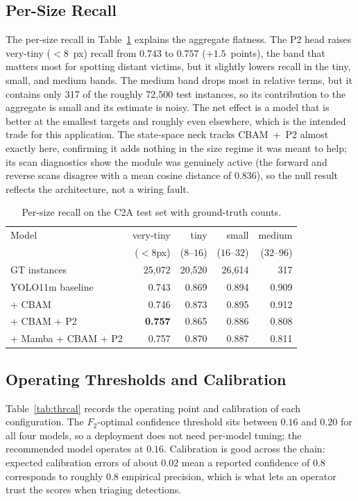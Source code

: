\subsection{Per-Size Recall}
The per-size recall in Table~\ref{tab:persize} explains the aggregate
flatness. The P2 head raises very-tiny ($<8$~px) recall from $0.743$ to
$0.757$ ($+1.5$~points), the band that matters most for spotting distant
victims, but it slightly lowers recall in the tiny, small, and medium bands.
The medium band drops most in relative terms, but it contains only 317 of the
roughly 72{,}500 test instances, so its contribution to the aggregate is
small and its estimate is noisy. The net effect is a model that is better at
the smallest targets and roughly even elsewhere, which is the intended trade
for this application. The state-space neck tracks CBAM~+~P2 almost exactly
here, confirming it adds nothing in the size regime it was meant to help; its
scan diagnostics show the module was genuinely active (the forward and
reverse scans disagree with a mean cosine distance of $0.836$), so the null
result reflects the architecture, not a wiring fault.

\begin{table}[H]
  \centering
  \caption{Per-size recall on the C2A test set with ground-truth counts.}
  \label{tab:persize}
  \begin{tabular}{@{}l r r r r@{}}
    \toprule
    Model & very-tiny & tiny & small & medium \\
    & ($<8$px) & ($8$--$16$) & ($16$--$32$) & ($32$--$96$) \\
    GT instances & 25{,}072 & 20{,}520 & 26{,}614 & 317 \\
    \midrule
    YOLO11m baseline    & 0.743 & 0.869 & 0.894 & 0.909 \\
    + CBAM              & 0.746 & 0.873 & 0.895 & 0.912 \\
    + CBAM + P2         & \textbf{0.757} & 0.865 & 0.886 & 0.808 \\
    + Mamba + CBAM + P2 & 0.757 & 0.870 & 0.887 & 0.811 \\
    \bottomrule
  \end{tabular}
\end{table}

\subsection{Operating Thresholds and Calibration}
Table~\ref{tab:thrcal} records the operating point and calibration of each
configuration. The $F_2$-optimal confidence threshold sits between $0.16$ and
$0.20$ for all four models, so a deployment does not need per-model tuning;
the recommended model operates at $0.16$. Calibration is good across the
chain: expected calibration errors of about $0.02$ mean a reported confidence
of $0.8$ corresponds to roughly $0.8$ empirical precision, which is what lets
an operator trust the scores when triaging detections.

